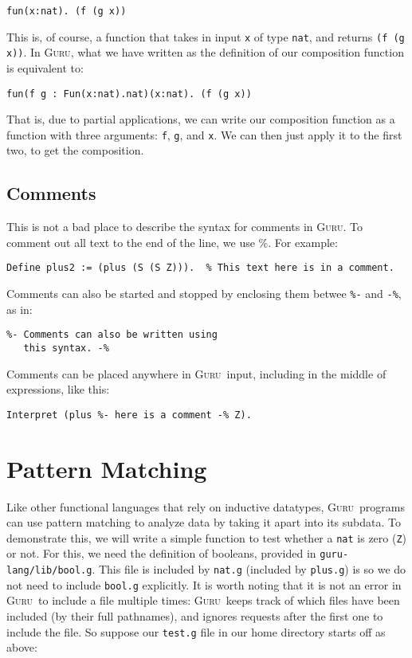 \documentclass{book}[12pt]
\newcommand{\guru}[0]{\textsc{Guru}}
\begin{document}
\begin{verbatim}
fun(x:nat). (f (g x))
\end{verbatim}

\noindent This is, of course, a function that takes in input \texttt{x} of type
\texttt{nat}, and returns \texttt{(f (g x))}.  In \guru, what we have written
as the definition of our composition function is equivalent to:

\begin{verbatim}
fun(f g : Fun(x:nat).nat)(x:nat). (f (g x))
\end{verbatim}

\noindent That is, due to partial applications, we can write our
composition function as a function with three arguments: \texttt{f},
\texttt{g}, and \texttt{x}.  We can then just apply it to the first
two, to get the composition.

\subsection{Comments}

This is not a bad place to describe the syntax for comments in \guru.  To
comment out all text to the end of the line, we use \%.  For example:

\begin{verbatim}
Define plus2 := (plus (S (S Z))).  % This text here is in a comment.
\end{verbatim}

\noindent Comments can also be started and stopped by enclosing them
betwee \texttt{\%-} and \texttt{-\%}, as in:

\begin{verbatim}
%- Comments can also be written using
   this syntax. -%
\end{verbatim}

\noindent Comments can be placed anywhere in \guru\ input, including in the
middle of expressions, like this:

\begin{verbatim}
Interpret (plus %- here is a comment -% Z).
\end{verbatim}

\section{Pattern Matching}

Like other functional languages that rely on inductive datatypes,
\guru\ programs can use pattern matching to analyze data by taking it
apart into its subdata.  To demonstrate this, we will write a simple
function to test whether a \texttt{nat} is zero (\texttt{Z}) or not.
For this, we need the definition of booleans, provided in
\texttt{guru-lang/lib/bool.g}.  This file is included by
\texttt{nat.g} (included by \texttt{plus.g}) is so we do not need to
include \texttt{bool.g} explicitly.  It is worth noting that it is not
an error in \guru\ to include a file multiple times: \guru\ keeps
track of which files have been included (by their full pathnames), and
ignores requests after the first one to include the file.  So suppose
our \texttt{test.g} file in our home directory starts off as above:
\end{document}
